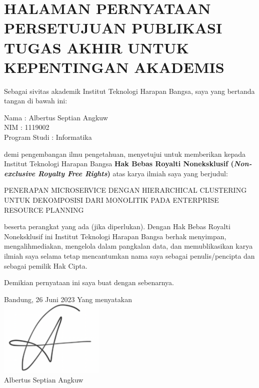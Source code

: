 \chapter*{\large HALAMAN PERNYATAAN PERSETUJUAN PUBLIKASI TUGAS AKHIR UNTUK KEPENTINGAN AKADEMIS}
	
	\noindent Sebagai sivitas akademik Institut Teknologi Harapan Bangsa, saya yang bertanda tangan di bawah ini:

	\begin{tabs}{3cm}
		\noindent Nama \tab : Albertus Septian Angkuw\\
		NIM \tab : 1119002\\
		Program Studi \tab : Informatika
	\end{tabs}
		
	\noindent demi pengembangan ilmu pengetahuan, menyetujui untuk memberikan kepada Institut Teknologi Harapan Bangsa \textbf{Hak Bebas Royalti Noneksklusif (\textit{Non-exclusive Royalty Free Rights})} atas karya ilmiah saya yang berjudul:
		
	\noindent PENERAPAN MICROSERVICE DENGAN HIERARCHICAL CLUSTERING UNTUK DEKOMPOSISI DARI MONOLITIK PADA ENTERPRISE RESOURCE PLANNING
		
	\noindent beserta perangkat yang ada (jika diperlukan). Dengan Hak Bebas Royalti Noneksklusif ini Institut Teknologi Harapan Bangsa berhak menyimpan, mengalihmediakan, mengelola dalam pangkalan data, dan memublikasikan karya ilmiah saya selama tetap mencantumkan nama saya sebagai penulis/pencipta dan sebagai pemilik Hak Cipta.
		
	\noindent Demikian pernyataan ini saya buat dengan sebenarnya.
	
	\noindent Bandung, 26 Juni 2023 \newline
	\noindent Yang menyatakan \\
 	\includegraphics[width=5cm]{img/sign.png}\\
	\noindent Albertus Septian Angkuw